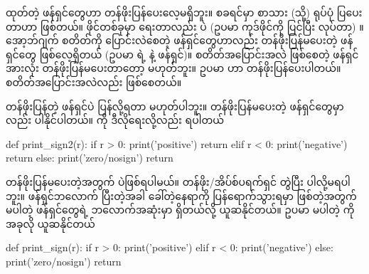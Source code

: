  ထုတ်တဲ့ ဖန်ရှင်တွေဟာ တန်ဖိုးပြန်ပေးလေ့မရှိဘူး။ စခရင်မှာ စာသား (သို့) ရုပ်ပုံ ပြပေးတာဟာ  ဖြစ်တယ်။ ဖိုင်တစ်ခုမှာ ရေးတာလည်း  ပဲ (ဥပမာ  ကုဒ်ဖိုင်ကို ပြင်ပြီး  လုပ်တာ) ။ အော့ဘ်ဂျက် စတိတ်ကို ပြောင်းလဲစေတဲ့ ဖန်ရှင်တွေဟာလည်း တန်ဖိုးပြန်မပေးတဲ့ ဖန်ရှင်တွေ ဖြစ်လေ့ရှိတယ် (ဥပမာ  ရဲ့  နဲ့  ဖန်ရှင်)။ စတိတ်အပြောင်းအလဲ ဖြစ်စေတဲ့ ဖန်ရှင်အားလုံး တန်ဖိုးပြန်မပေးတာတော့ မဟုတ်ဘူး။ ဥပမာ  ဟာ တန်ဖိုးပြန်ပေးပါတယ်။ စတိတ်အပြောင်းအလဲလည်း ဖြစ်စေတယ်။

တန်ဖိုးပြန်တဲ့ ဖန်ရှင်ပဲ  ပြန်လို့ရတာ မဟုတ်ပါဘူး။ တန်ဖိုးပြန်မပေးတဲ့ ဖန်ရှင်တွေမှာလည်း  ပါနိုင်ပါတယ်။  ကို ဒီလိုရေးလို့လည်း ရပါတယ်
%
\begin{py}
def print_sign2(r):
    if r > 0:
        print('positive')
        return
    elif r < 0:
        print('negative')
        return
    else:
        print('zero/nosign')
        return
\end{py}
%
တန်ဖိုးပြန်မပေးတဲ့အတွက်  ပဲဖြစ်ရပါမယ်။ တန်ဖိုး/အိပ်စ်ပရက်ရှင် တွဲပြီး ပါလို့မရပါဘူး။ ဖန်ရှင်ဘလောက် ပြီးတဲ့အခါ ခေါ်တဲ့နေရာကို ပြန်ရောက်သွားရမှာ ဖြစ်တဲ့အတွက်  မပါတဲ့ ဖန်ရှင်တွေရဲ့ ဘလောက်အဆုံးမှာ  ရှိတယ်လို့ ယူဆနိုင်တယ်။ ဥပမာ  မပါတဲ့  ကို အခုလို ယူဆနိုင်တယ်
%
\begin{py}
def print_sign(r):
    if r > 0:
        print('positive')
    elif r < 0:
        print('negative')
    else:
        print('zero/nosign')
    return 
\end{py}
%

